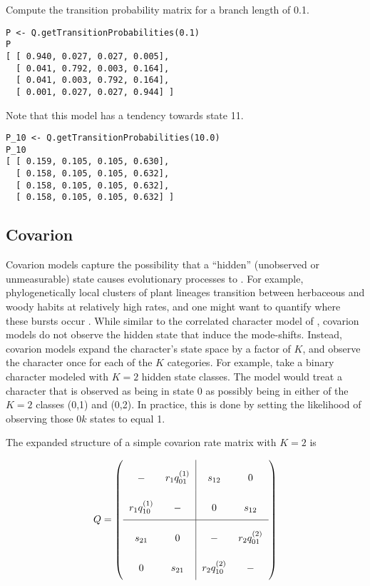 Compute the transition probability matrix for a branch length of 0.1.

{\tt \begin{snugshade*}
\begin{lstlisting}
P <- Q.getTransitionProbabilities(0.1)
P
[ [ 0.940, 0.027, 0.027, 0.005],
  [ 0.041, 0.792, 0.003, 0.164],
  [ 0.041, 0.003, 0.792, 0.164],
  [ 0.001, 0.027, 0.027, 0.944] ]
\end{lstlisting}
\end{snugshade*}}

Note that this model has a tendency towards state 11.

{\tt \begin{snugshade*}
\begin{lstlisting}
P_10 <- Q.getTransitionProbabilities(10.0)
P_10
[ [ 0.159, 0.105, 0.105, 0.630],
  [ 0.158, 0.105, 0.105, 0.632],
  [ 0.158, 0.105, 0.105, 0.632],
  [ 0.158, 0.105, 0.105, 0.632] ]
\end{lstlisting}
\end{snugshade*}}


\subsection{Covarion}

Covarion models \citep{tuffley98} capture the possibility that a ``hidden'' (unobserved or unmeasurable) state causes evolutionary processes to .
For example, phylogenetically local clusters of plant lineages transition between herbaceous and woody habits at relatively high rates, and one might want to quantify where these bursts occur \citep{beaulieu15}.
While similar to the correlated character model of \citet{pagel94}, covarion models do not observe the hidden state that induce the mode-shifts.
Instead, covarion models expand the character's state space by a factor of $K$, and observe the character once for each of the $K$ categories.
For example, take a binary character modeled with $K=2$ hidden state classes.
The model would treat a character that is observed as being in state 0 as possibly being in either of the $K=2$ classes (0,1) and (0,2).
In practice, this is done by setting the likelihood of observing those $0k$ states to equal 1.

The expanded structure of a simple covarion rate matrix with $K=2$ is

\begin{equation*}
Q = \left(
\arraycolsep=6pt\def\arraystretch{2.5}
\begin{array}{cc|cc}
- & r_1 q_{01}^{(1)} & s_{12} & 0 \\
r_1 q_{10}^{(1)} & - & 0 & s_{12} \\
\hline
s_{21} & 0 & - & r_2 q_{01}^{(2)} \\
0 & s_{21} & r_2 q_{10}^{(2)} & -  \\

\end{array}
\right)    
\end{equation*}

